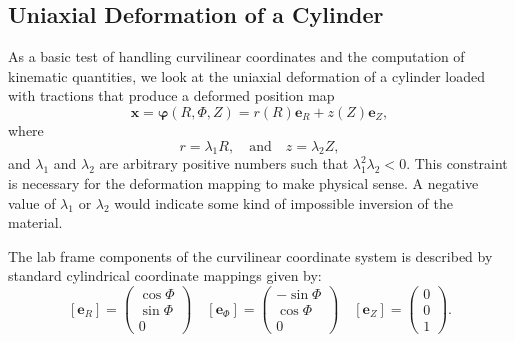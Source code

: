 \documentclass[]{spie}  %
\begin{document}
\subsection{Uniaxial Deformation of a Cylinder}
As a basic test of handling curvilinear coordinates and the computation of kinematic quantities, we look at the uniaxial deformation of a cylinder loaded with tractions that produce a deformed position map
\[
\bm{x} = \bm{\varphi}(R,\Phi,Z) = r(R) \bm{e}_R + z(Z) \bm{e}_Z ,
\]
where 
\[
r = \lambda_1 R, \quad \text{and} \quad z = \lambda_2 Z,
\]
and $\lambda_1$ and $\lambda_2$ are arbitrary positive numbers such that $\lambda_1^2\lambda_2<0$. This constraint is necessary for the deformation mapping to make physical sense. A negative value of $\lambda_1$ or $\lambda_2$ would indicate some kind of impossible inversion of the material. 

The lab frame components of the curvilinear coordinate system is described by standard cylindrical coordinate mappings given by:
\[
[\bm{e}_R] = \begin{pmatrix} \cos\Phi \\ \sin\Phi \\ 0 \end{pmatrix}
\quad
[\bm{e}_\Phi] = \begin{pmatrix} -\sin\Phi \\ \cos\Phi \\ 0 \end{pmatrix}
\quad
[\bm{e}_Z] = \begin{pmatrix} 0\\ 0\\ 1 \end{pmatrix}.
\]
\end{document}
